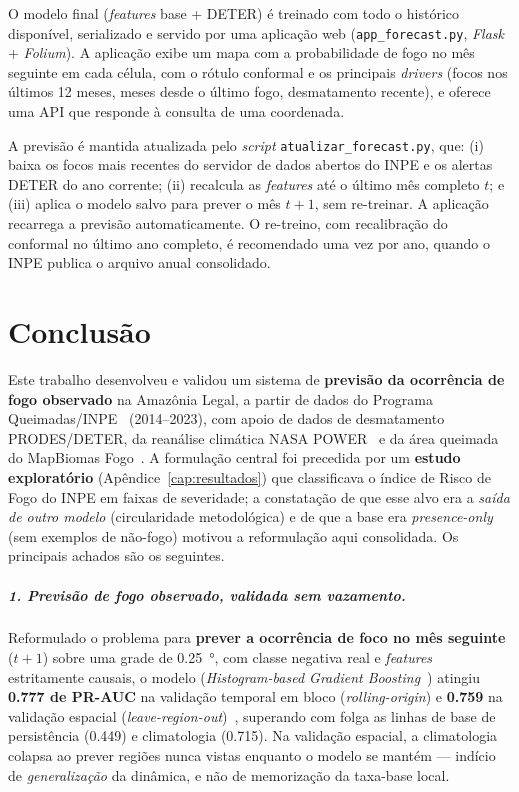 \documentclass[tcc2]{uftex}
\begin{document}
O modelo final (\emph{features} base + DETER) é treinado com todo o histórico disponível, serializado e servido por uma aplicação web (\texttt{app\_forecast.py}, \emph{Flask} + \emph{Folium}). A aplicação exibe um mapa com a probabilidade de fogo no mês seguinte em cada célula, com o rótulo conformal e os principais \emph{drivers} (focos nos últimos 12 meses, meses desde o último fogo, desmatamento recente), e oferece uma API que responde à consulta de uma coordenada.

A previsão é mantida atualizada pelo \emph{script} \texttt{atualizar\_forecast.py}, que: (i) baixa os focos mais recentes do servidor de dados abertos do INPE e os alertas DETER do ano corrente; (ii) recalcula as \emph{features} até o último mês completo \(t\); e (iii) aplica o modelo salvo para prever o mês \(t+1\), sem re-treinar. A aplicação recarrega a previsão automaticamente. O re-treino, com recalibração do conformal no último ano completo, é recomendado uma vez por ano, quando o INPE publica o arquivo anual consolidado.




\chapter{Conclusão}
\label{cap:conclusao}

Este trabalho desenvolveu e validou um sistema de \textbf{previsão da ocorrência de fogo observado} na Amazônia Legal, a partir de dados do Programa Queimadas/INPE~\cite{INPE24} (2014--2023), com apoio de dados de desmatamento PRODES/DETER, da reanálise climática NASA POWER~\cite{nasapower} e da área queimada do MapBiomas Fogo~\cite{mapbiomasfogo}. A formulação central foi precedida por um \textbf{estudo exploratório} (Apêndice~\ref{cap:resultados}) que classificava o índice de Risco de Fogo do INPE em faixas de severidade; a constatação de que esse alvo era a \emph{saída de outro modelo} (circularidade metodológica) e de que a base era \emph{presence-only} (sem exemplos de não-fogo) motivou a reformulação aqui consolidada. Os principais achados são os seguintes.

\paragraph{1. Previsão de fogo observado, validada sem vazamento.} Reformulado o problema para \textbf{prever a ocorrência de foco no mês seguinte} (\(t+1\)) sobre uma grade de \SI{0,25}{\degree}, com classe negativa real e \emph{features} estritamente causais, o modelo (\emph{Histogram-based Gradient Boosting}~\cite{friedman2001greedy}) atingiu \textbf{\num{0,777} de PR-AUC} na validação temporal em bloco (\emph{rolling-origin}) e \textbf{\num{0,759}} na validação espacial (\emph{leave-region-out})~\cite{roberts2017cv}, superando com folga as linhas de base de persistência (\num{0,449}) e climatologia (\num{0,715}). Na validação espacial, a climatologia colapsa ao prever regiões nunca vistas enquanto o modelo se mantém --- indício de \emph{generalização} da dinâmica, e não de memorização da taxa-base local.
\end{document}
